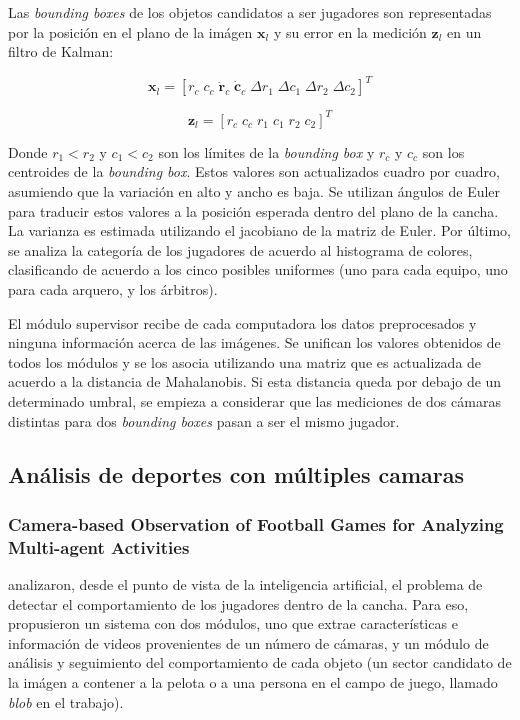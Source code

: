 \documentclass[a4paper,10pt]{article}
\begin{document}
Las \textit{bounding boxes} de los objetos candidatos a ser jugadores son
representadas por la posición en el plano de la imágen $\mathbf{x}_l$ y su
error en la medición $\mathbf{z}_l$ en un filtro de Kalman:

\[
\mathbf{x}_l = [r_c \; c_c \;  \mathbf{\dot r}_c  \; \mathbf{\dot c}_c \;  \Delta r_1  \; \Delta c_1 \;  \Delta r_2 \;  \Delta c_2]^T
\]

\[
\mathbf{z}_l = [r_c \;  c_c  \; r_1  \; c_1  \; r_2  \; c_2]^T
\]

Donde $r_1 < r_2$ y $c_1 < c_2$ son los límites de la \textit{bounding box} y
$r_c$ y $c_c$ son los centroides de la \textit{bounding box}. Estos valores son
actualizados cuadro por cuadro, asumiendo que la variación en alto y ancho es
baja. Se utilizan ángulos de Euler para traducir estos valores a la posición
esperada dentro del plano de la cancha. La varianza es estimada utilizando el
jacobiano de la matriz de Euler. Por último, se analiza la categoría de los
jugadores de acuerdo al histograma de colores, clasificando de acuerdo a los
cinco posibles uniformes (uno para cada equipo, uno para cada arquero, y los
árbitros).

El módulo supervisor recibe de cada computadora los datos preprocesados y
ninguna información acerca de las imágenes. Se unifican los valores obtenidos
de todos los módulos y se los asocia utilizando una matriz que es actualizada
de acuerdo a la distancia de Mahalanobis. Si esta distancia queda por debajo de
un determinado umbral, se empieza a considerar que las mediciones de dos
cámaras distintas para dos \textit{bounding boxes} pasan a ser el mismo
jugador.

\subsection{Análisis de deportes con múltiples camaras}
\label{sec:var-camaras}

\subsubsection{Camera-based Observation of Football Games for Analyzing Multi-agent Activities}

\citeauthor*{beetz-05} analizaron, desde el punto de vista de la inteligencia
artificial, el problema de detectar el comportamiento de los jugadores dentro
de la cancha. Para eso, propusieron un sistema con dos módulos, uno que extrae
características e información de videos provenientes de un número de cámaras, y
un módulo de análisis y seguimiento del comportamiento de cada objeto (un
sector candidato de la imágen a contener a la pelota o a una persona en el campo de
juego, llamado \textit{blob} en el trabajo).
\end{document}
